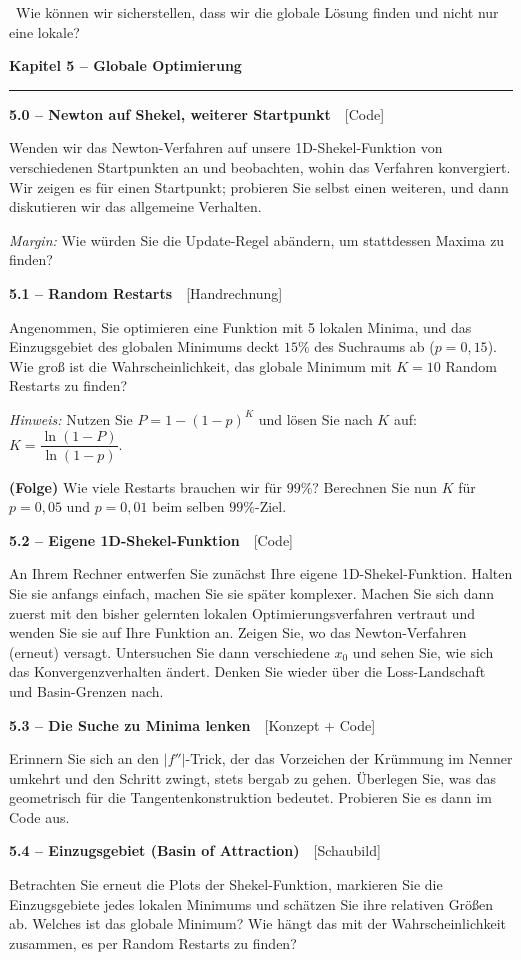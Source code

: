 \documentclass[a4paper,10pt]{article}
\newcommand{\kapitel}[1]{%
  \par\vspace{7pt}
  {\large\bfseries\color{accent} #1}\par
  \noindent\textcolor{accent}{\rule{\linewidth}{0.8pt}}\par\vspace{2pt}}
\newcommand{\aufg}[2]{%
  \par\vspace{3pt}
  {\bfseries\color{accent2} #1}~~{\footnotesize\color{accent2}[#2]}\par\vspace{1pt}}
\newcommand{\teaser}[1]{%
  \par\vspace{2pt}{\color{accent4}\textbf{Denkanstoß.}}~#1\par}
\begin{document}
\teaser{Wie können wir sicherstellen, dass wir die globale Lösung finden und nicht
nur eine lokale?}

\kapitel{Kapitel 5 \;--\; Globale Optimierung}

\aufg{5.0 \;--\; Newton auf Shekel, weiterer Startpunkt}{Code}
Wenden wir das Newton-Verfahren auf unsere 1D-Shekel-Funktion von verschiedenen
Startpunkten an und beobachten, wohin das Verfahren konvergiert. Wir zeigen es für
einen Startpunkt; probieren Sie selbst einen weiteren, und dann diskutieren wir das
allgemeine Verhalten.
\par\textit{Margin:} Wie würden Sie die Update-Regel abändern, um stattdessen Maxima
zu finden?

\aufg{5.1 \;--\; Random Restarts}{Handrechnung}
Angenommen, Sie optimieren eine Funktion mit 5 lokalen Minima, und das Einzugsgebiet
des globalen Minimums deckt $15\%$ des Suchraums ab ($p=0{,}15$). Wie groß ist die
Wahrscheinlichkeit, das globale Minimum mit $K=10$ Random Restarts zu finden?
\par\textit{Hinweis:} Nutzen Sie $P=1-(1-p)^K$ und lösen Sie nach $K$ auf:
$K=\dfrac{\ln(1-P)}{\ln(1-p)}$.
\par\textbf{(Folge)} Wie viele Restarts brauchen wir für $99\%$? \quad Berechnen Sie
nun $K$ für $p=0{,}05$ und $p=0{,}01$ beim selben $99\%$-Ziel.

\aufg{5.2 \;--\; Eigene 1D-Shekel-Funktion}{Code}
An Ihrem Rechner entwerfen Sie zunächst Ihre eigene 1D-Shekel-Funktion. Halten Sie
sie anfangs einfach, machen Sie sie später komplexer. Machen Sie sich dann zuerst mit
den bisher gelernten lokalen Optimierungsverfahren vertraut und wenden Sie sie auf
Ihre Funktion an. Zeigen Sie, wo das Newton-Verfahren (erneut) versagt. Untersuchen
Sie dann verschiedene $x_0$ und sehen Sie, wie sich das Konvergenzverhalten ändert.
Denken Sie wieder über die Loss-Landschaft und Basin-Grenzen nach.

\aufg{5.3 \;--\; Die Suche zu Minima lenken}{Konzept + Code}
Erinnern Sie sich an den $|f''|$-Trick, der das Vorzeichen der Krümmung im Nenner
umkehrt und den Schritt zwingt, stets bergab zu gehen. Überlegen Sie, was das
geometrisch für die Tangentenkonstruktion bedeutet. Probieren Sie es dann im Code aus.

\aufg{5.4 \;--\; Einzugsgebiet (Basin of Attraction)}{Schaubild}
Betrachten Sie erneut die Plots der Shekel-Funktion, markieren Sie die Einzugsgebiete
jedes lokalen Minimums und schätzen Sie ihre relativen Größen ab. Welches ist das
globale Minimum? Wie hängt das mit der Wahrscheinlichkeit zusammen, es per Random
Restarts zu finden?
\end{document}
